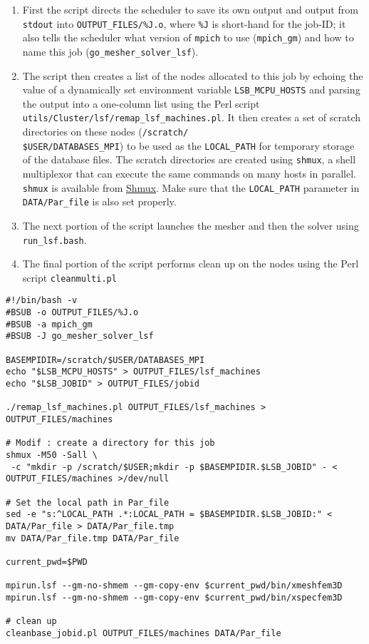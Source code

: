 \begin{enumerate}
\item First the script directs the scheduler to save its own output and
output from \texttt{stdout} into \texttt{\small OUTPUT\_FILES/\%J.o},
where \texttt{\%J} is short-hand for the job-ID; it also tells the
scheduler what version of \texttt{mpich} to use (\texttt{mpich\_gm})
and how to name this job (\texttt{go\_mesher\_solver\_lsf}).
\item The script then creates a list of the nodes allocated to this job
by echoing the value of a dynamically set environment variable \texttt{LSB\_MCPU\_HOSTS}
and parsing the output into a one-column list using the Perl script
\texttt{utils/Cluster/lsf/remap\_lsf\_machines.pl}. It then creates a set of scratch
directories on these nodes (\texttt{\small /scratch/}~\\
\texttt{\small \$USER/DATABASES\_MPI}) to be used as the \texttt{LOCAL\_PATH}
for temporary storage of the database files. The scratch directories
are created using \texttt{shmux}, a shell multiplexor that can execute
the same commands on many hosts in parallel. \texttt{shmux} is available
from \href{http://web.taranis.org/shmux/}{Shmux}. Make sure that the \texttt{LOCAL\_PATH}
parameter in \texttt{DATA/Par\_file} is also set properly.
\item The next portion of the script launches the mesher and then the solver
using \texttt{run\_lsf.bash}.
\item The final portion of the script performs clean up on the nodes using
the Perl script \texttt{cleanmulti.pl}
\end{enumerate}
{\small
\begin{verbatim}
#!/bin/bash -v
#BSUB -o OUTPUT_FILES/%J.o
#BSUB -a mpich_gm
#BSUB -J go_mesher_solver_lsf

BASEMPIDIR=/scratch/$USER/DATABASES_MPI
echo "$LSB_MCPU_HOSTS" > OUTPUT_FILES/lsf_machines
echo "$LSB_JOBID" > OUTPUT_FILES/jobid

./remap_lsf_machines.pl OUTPUT_FILES/lsf_machines > OUTPUT_FILES/machines

# Modif : create a directory for this job
shmux -M50 -Sall \
 -c "mkdir -p /scratch/$USER;mkdir -p $BASEMPIDIR.$LSB_JOBID" - < OUTPUT_FILES/machines >/dev/null

# Set the local path in Par_file
sed -e "s:^LOCAL_PATH .*:LOCAL_PATH = $BASEMPIDIR.$LSB_JOBID:" < DATA/Par_file > DATA/Par_file.tmp
mv DATA/Par_file.tmp DATA/Par_file

current_pwd=$PWD

mpirun.lsf --gm-no-shmem --gm-copy-env $current_pwd/bin/xmeshfem3D
mpirun.lsf --gm-no-shmem --gm-copy-env $current_pwd/bin/xspecfem3D

# clean up
cleanbase_jobid.pl OUTPUT_FILES/machines DATA/Par_file
\end{verbatim}
}


